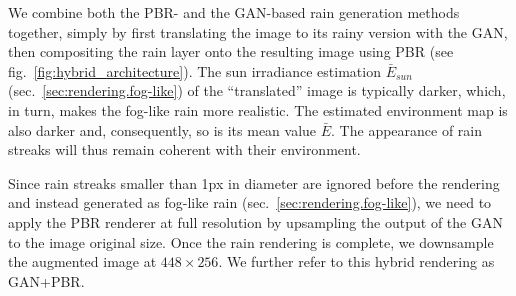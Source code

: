 We combine both the PBR- and the GAN-based rain generation methods together, simply by first translating the image to its rainy version with the GAN, then compositing the rain layer onto the resulting image using PBR (see fig.~\ref{fig:hybrid_architecture}). The sun irradiance estimation $\bar{E}_{sun}$ (sec.~\ref{sec:rendering.fog-like}) of the ``translated'' image is typically darker, which, in turn, makes the fog-like rain more realistic. The estimated environment map is also darker and, consequently, so is its mean value $\bar{E}$. The appearance of rain streaks will thus remain coherent with their environment.

Since rain streaks smaller than 1px in diameter are ignored before the rendering and instead generated as fog-like rain (sec.~\ref{sec:rendering.fog-like}), we need to apply the PBR renderer at full resolution by upsampling the output of the GAN to the image original size. Once the rain rendering is complete, we downsample the augmented image at $448\times256$.
We further refer to this hybrid rendering as GAN+PBR.
